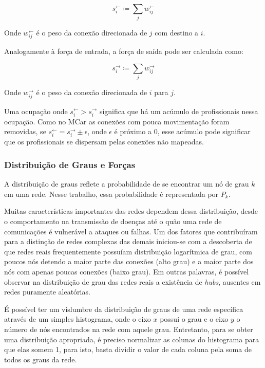 \documentclass[12pt,a4paper]{article}
\theoremstyle{hypo}
\newcommand{\defn}{\coloneqq} %
\newcommand{\linkin}[1]{#1^\leftarrow} %
\newcommand{\linkout}[1]{#1^\rightarrow} %
\newcommand{\win}{w^\leftarrow} %
\newcommand{\wout}{w^\rightarrow} %
\begin{document}
\begin{equation} \label{eq:forca-entrada}
\linkin{s}_i \defn \sum_{j} \win_{ij}
\end{equation}

Onde $\win_{ij}$ é o peso da conexão direcionada de $j$ com destino a $i$.

Analogamente à força de entrada, a força de saída pode ser calculada como:

\begin{equation} \label{eq:forca-saida}
\linkout{s}_i \defn \sum_{j} \wout_{ij}
\end{equation}

Onde $\wout_{ij}$ é o peso da conexão direcionada de $i$ para $j$.


Uma ocupação onde $\linkin{s}_i > \linkout{s}_i$ significa que há um acúmulo de profissionais nessa ocupação. Como no MCar as conexões com pouca movimentação foram removidas, se $\linkin{s}_i = \linkout{s}_i \pm \epsilon$, onde $\epsilon$ é próximo a 0, esse acúmulo pode significar que os profissionais se dispersam pelas conexões não mapeadas. 

\subsubsection{Distribuição de Graus e Forças} \label{sec:distribuicao-grau-forca}

A distribuição de graus reflete a probabilidade de se encontrar um nó de grau $k$ em uma rede. Nesse trabalho, essa probabilidade é representada por $P_k$.

Muitas características importantes das redes dependem dessa distribuição, desde o comportamento na transmissão de doenças até o quão uma rede de comunicações é vulnerável a ataques ou falhas. Um dos fatores que contribuíram para a distinção de redes complexas das demais iniciou-se com a descoberta de \cite{Barabasi1999-sn} que redes reais frequentemente possuíam distribuição logarítmica de grau, com poucos nós detendo a maior parte das conexões (alto grau) e a maior parte dos nós com apenas poucas conexões (baixo grau). Em outras palavras, é possível observar na distribuição de grau das redes reais a existência de \textit{hubs}, ausentes em redes puramente aleatórias.

É possível ter um vislumbre da distribuição de graus de uma rede específica através de um simples histograma, onde o eixo $x$ possui o grau e o eixo $y$ o número de nós encontrados na rede com aquele grau. Entretanto, para se obter uma distribuição apropriada, é preciso normalizar as colunas do histograma para que elas somem 1, para isto, basta dividir o valor de cada coluna pela soma de todos os graus da rede.
\end{document}
